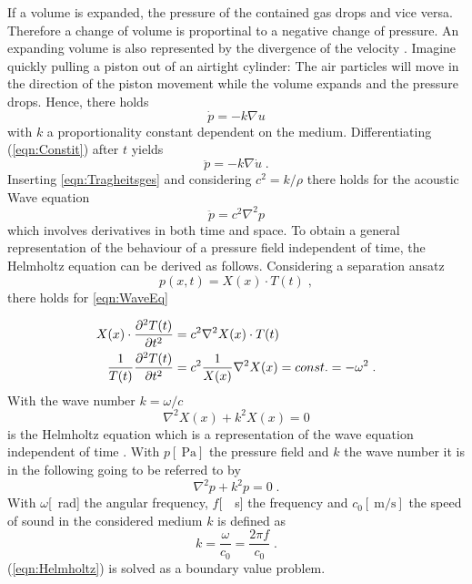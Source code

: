 \documentclass[%
  a4paper,oneside,%
  11pt,%
  smallchapters,
  green,%
  rgb, <cmyk>
  ]{tubsbook}
\begin{document}
If a volume is expanded, the pressure of the contained gas drops and vice versa. Therefore a change of volume is proportinal to a negative change of pressure. An expanding volume is also represented by the divergence of the velocity \cite{larson2013}. Imagine quickly pulling a piston out of an airtight cylinder: The air particles will move in the direction of the piston movement while the volume expands and the pressure drops. Hence, there holds
\begin{equation}
\dot{p} = -k \nabla u
\label{eqn:Constit}
\end{equation}
with $k$ a proportionality constant dependent on the medium.
Differentiating (\ref{eqn:Constit}) after $t$ yields 
\begin{equation}
\ddot{p} = -k \nabla \dot{u} \;.
\end{equation}
Inserting \ref{eqn:Tragheitsges} and considering $c^2 = k/\rho$ there holds for the acoustic Wave equation
\begin{equation}
\ddot{p} = c^2 \nabla^2 p 
\label{eqn:WaveEq}
\end{equation}
which involves derivatives in both time and space. To obtain a general representation of the behaviour of a pressure field independent of time, the Helmholtz equation can be derived as follows.
Considering a separation ansatz \cite{westermann2015}
\begin{equation}
p(x,t) = X(x) \cdot T(t) \; ,
\end{equation}
there holds for \ref{eqn:WaveEq}

\begin{align}
X(x) \cdot \pdv[2]{T(t)}{t} &= c^2 \nabla^2 X(x) \cdot T(t)\\
\frac{1}{T(t)} \pdv[2]{T(t)}{t} &= c^2 \frac{1}{X(x)} \nabla^2 X(x) = const. = - \omega^2 \; .
\end{align}
With the wave number $k = \omega / c$ 
\begin{equation}
\nabla^2 X(x) + k^2 X(x) = 0
\end{equation}
is the Helmholtz equation which is a representation of the wave equation independent of time \cite[p. 1083 ff.]{arens2015}.
%
With $p [\SI{}{\pascal}]$ the pressure field and $k$ the wave number it is in the following going to be referred to by
\begin{equation}
\nabla^2 p + k^2 p = 0 \;.
\label{eqn:Helmholtz}
\end{equation}
With $\omega$[\SI{}{\radian}] the angular frequency, $f$[\SI{}{\per\s}] the frequency and $c_0[\SI{}{\metre\per\s}]$ the speed of sound in the considered medium $k$ is defined as
\begin{equation}
k = \frac{\omega}{c_0} = \frac{2 \pi f}{c_0} \;.
\end{equation}
(\ref{eqn:Helmholtz}) is solved as a boundary value problem.
\end{document}
